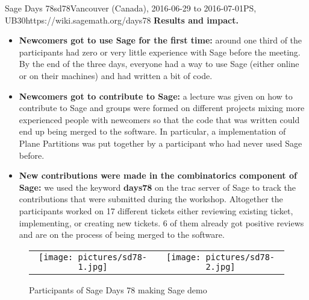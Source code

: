 \begin{event}{Sage Days 78}{sd78}{Vancouver (Canada), 2016-06-29 to 2016-07-01}{PS, UB}{30}{https://wiki.sagemath.org/days78}
\textbf{Results and impact.} 
\begin{itemize}
\item \textbf{Newcomers got to use Sage for the first time:} around one
third of the participants had zero or very little experience with Sage before the meeting. By the
end of the three days, everyone had a way to use Sage (either online or on their machines)
and had written a bit of code.
\item \textbf{Newcomers got to contribute to Sage:} a lecture was given on how to contribute to Sage
and groups were formed on different projects mixing more experienced people with newcomers so
that the code that was written could end up being merged to the software. In particular, a implementation
of Plane Partitions was put together by a participant who had never used Sage before.
\item \textbf{New contributions were made in the combinatorics component of Sage:} we used the keyword
\textbf{days78} on the trac server of Sage to track the contributions that were submitted during the workshop.
 Altogether the participants
worked on 17 different tickets either reviewing
existing ticket, implementing, or creating new tickets. 6 of them already got positive reviews and are
on the process of being merged to the software.
\end{itemize}

\begin{figure}[ht]
\caption*{Participants of Sage Days 78 making Sage demo}
\begin{tabular}{cc}
\texttt{[image: pictures/sd78-1.jpg]}
&
\texttt{[image: pictures/sd78-2.jpg]}
\end{tabular}
\end{figure}



\end{event}